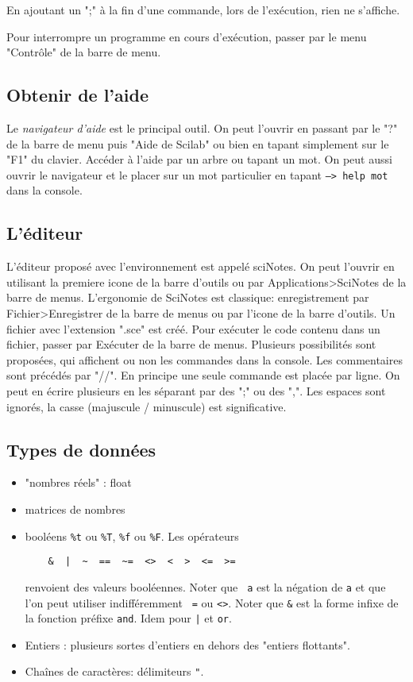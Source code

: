 En ajoutant un ";" à la fin d'une commande, lors de l'exécution, rien ne s'affiche.

Pour interrompre un programme en cours d'exécution, passer par le menu "Contrôle" de la barre de menu.
\subsection{Obtenir de l'aide}
Le \emph{navigateur d'aide} est le principal outil. On peut l'ouvrir en passant par le "?" de la barre de menu puis "Aide de Scilab" ou bien en tapant simplement sur le "F1" du clavier. Accéder à l'aide par un arbre ou tapant un mot.\newline
On peut aussi ouvrir le navigateur et le placer sur un mot particulier en tapant \texttt{--> help mot} dans la console.

\subsection{L'éditeur}
L'éditeur proposé avec l'environnement est appelé sciNotes. On peut l'ouvrir en utilisant la premiere icone de la barre d'outils ou par Applications>SciNotes de la barre de menus.\newline
L'ergonomie de SciNotes est classique: enregistrement par Fichier>Enregistrer de la barre de menus ou par l'icone de la barre d'outils. Un fichier avec l'extension ".sce" est créé.\newline
Pour exécuter le code contenu dans un fichier, passer par Exécuter de la barre de menus. Plusieurs possibilités sont proposées, qui affichent ou non les commandes dans la console.\newline
Les commentaires sont précédés par "//". En principe une seule commande est placée par ligne. On peut en écrire plusieurs en les séparant par des ";" ou des ",".\newline
Les espaces sont ignorés, la casse (majuscule / minuscule) est significative.

\subsection{Types de données}
\begin{itemize}
  \item "nombres réels" : float
  \item matrices de nombres
  \item booléens \texttt{\%t} ou \texttt{\%T}, \texttt{\%f} ou \texttt{\%F}. Les opérateurs 
  \begin{verbatim}
    &  |  ~  ==  ~=  <>  <  >  <=  >=
  \end{verbatim}
renvoient des valeurs booléennes. Noter que \texttt{~a} est la négation de \texttt{a} et que l'on peut utiliser indifféremment \texttt{~=} ou \texttt{<>}.
Noter que \texttt{\&} est la forme infixe de la fonction préfixe \texttt{and}. Idem pour \texttt{|} et \texttt{or}.
\item Entiers : plusieurs sortes d'entiers en dehors des "entiers flottants".
\item Chaînes de caractères: délimiteurs \texttt{"}.
\end{itemize}

